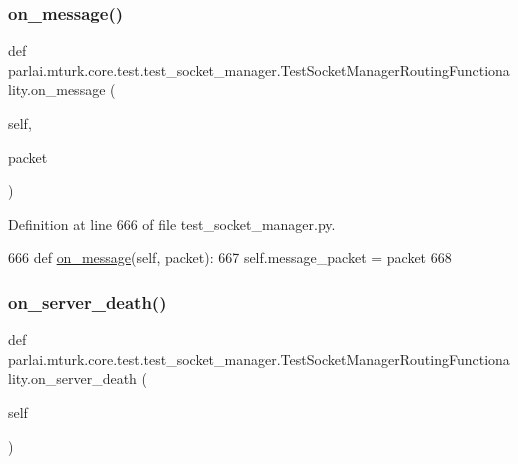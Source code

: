 \subsubsection{\texorpdfstring{on\+\_\+message()}{on\_message()}}
{\footnotesize\ttfamily def parlai.\+mturk.\+core.\+test.\+test\+\_\+socket\+\_\+manager.\+Test\+Socket\+Manager\+Routing\+Functionality.\+on\+\_\+message (\begin{DoxyParamCaption}\item[{}]{self,  }\item[{}]{packet }\end{DoxyParamCaption})}



Definition at line 666 of file test\+\_\+socket\+\_\+manager.\+py.


\begin{DoxyCode}
666     \textcolor{keyword}{def }\hyperlink{namespaceparlai_1_1chat__service_1_1services_1_1browser__chat_1_1client_a01c1536b48e2f5badd2fe58ea02b9a5c}{on\_message}(self, packet):
667         self.message\_packet = packet
668 
\end{DoxyCode}
\mbox{\label{classparlai_1_1mturk_1_1core_1_1test_1_1test__socket__manager_1_1TestSocketManagerRoutingFunctionality_a99bd283fec6b6422df3b0cd47ece433d}} 
\subsubsection{\texorpdfstring{on\+\_\+server\+\_\+death()}{on\_server\_death()}}
{\footnotesize\ttfamily def parlai.\+mturk.\+core.\+test.\+test\+\_\+socket\+\_\+manager.\+Test\+Socket\+Manager\+Routing\+Functionality.\+on\+\_\+server\+\_\+death (\begin{DoxyParamCaption}\item[{}]{self }\end{DoxyParamCaption})}



